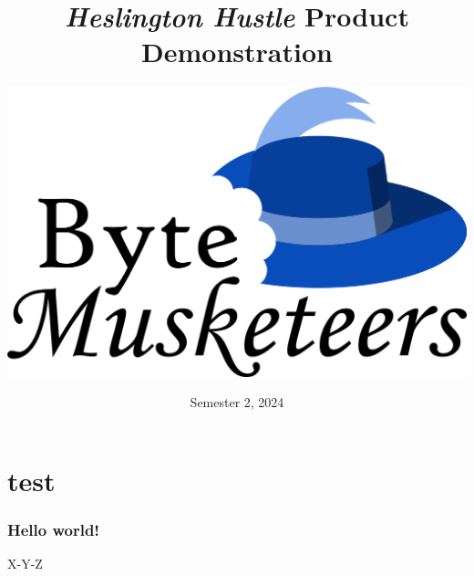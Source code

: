 \documentclass{beamer}
\title{\emph{Heslington Hustle} Product Demonstration}
\author[\groupname]{%
    \texorpdfstring{\includegraphics[width=0.3\linewidth]{../logo}}{\groupname}}
\institute{Department of Computer Science, University of York}
\date{Semester 2, 2024}
\numberwithin{figure}{section}
\begin{document}
\frame{\titlepage}
\section{test}
\begin{frame}
    \frametitle{Hello world!}
    X-Y-Z
\end{frame}
\end{document}
